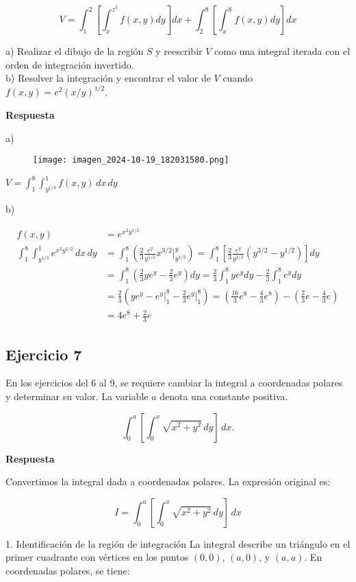 \documentclass{report}
\begin{document}
$$
V = \int_{1}^{2}\left[\int_{x}^{z^{3}} f(x, y) d y\right] d x+\int_{2}^{8}\left[\int_{x}^{8} f(x, y) d y\right] d x
$$

a) Realizar el dibujo de la región $S$ y reescribir $V$ como una integral iterada con el orden de integración invertido.\\
b) Resolver la integración y encontrar el valor de $V$ cuando $f(x, y) = e^{2}(x / y)^{1 / 2}$.

\textbf{Respuesta}

a)

\begin{figure}[h]
\texttt{[image: imagen\_2024-10-19\_182031580.png]}
\centering
\end{figure}

$V = \int_1^8 \int_{y^{1/3}}^1 f(x, y) \, dx \, dy$

b)

\[
\begin{aligned}
    f(x, y) &= e^{x^2 y^{1/2}} \\
    \int_1^8 \int_{y^{1/3}}^1 e^{x^2 y^{1/2}} \, dx \, dy 
    &=\int_1^8\left(\frac{2}{3}\frac{e^y}{y^{1/2}}x^{3/2} \Bigg|_{y^{1/3}}^{y}\right)
    =\int_1^8\left[\frac{2}{3}\frac{e^y}{y^{1/2}}(y^{3/2}-y^{1/2})\right]dy\\
    &=\int_1^8(\frac{2}{3}ye^y -\frac{2}{3}e^y)dy
    =\frac{2}{3}\int_1^8 ye^y dy-\frac{2}{3}\int_1^8e^y dy\\
    &=\frac{2}{3}\left(ye^y-e^y\Bigg|_1^8-\frac{2}{3}e^y\Bigg|_1^8\right)
    =\left(\frac{16}{3}e^8-\frac{4}{3}e^8\right)-\left(\frac{2}{3}e-\frac{4}{3}e\right)\\
    &=  4 e^8 + \frac{2}{3} e
\end{aligned}
\]\subsection{Ejercicio 7}
En los ejercicios del 6 al 9, se requiere cambiar la integral a coordenadas polares y determinar su valor. La variable \(a\) denota una constante positiva.

\[\int_{0}^{a}\left[\int_{0}^{x} \sqrt{x^{2}+y^{2}} \, dy\right] \, dx.\]

\textbf{Respuesta}

Convertimos la integral dada a coordenadas polares. La expresión original es:

\[
I = \int_0^a \left[ \int_0^x \sqrt{x^2 + y^2} \, dy \right] \, dx
\]

1. Identificación de la región de integración  
La integral describe un triángulo en el primer cuadrante con vértices en los puntos \( (0,0) \), \( (a,0) \), y \( (a,a) \). En coordenadas polares, se tiene:  
\end{document}

